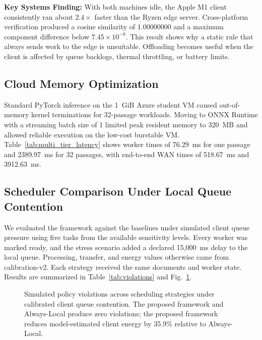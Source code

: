 \documentclass[conference]{IEEEtran}
\begin{document}
\textbf{Key Systems Finding:} With both machines idle, the Apple M1 client consistently ran about $2.4\times$ faster than the Ryzen edge server.
Cross-platform verification produced a cosine similarity of $1.00000000$ and a maximum component difference below $7.45\times10^{-8}$.
This result shows why a static rule that always sends work to the edge is unsuitable. Offloading becomes useful when the client is affected by queue backlogs, thermal throttling, or battery limits.

\subsection{Cloud Memory Optimization}
Standard PyTorch inference on the 1~GiB Azure student VM caused out-of-memory kernel terminations for 32-passage workloads.
Moving to ONNX Runtime with a streaming batch size of 1 limited peak resident memory to 320~MB and allowed reliable execution on the low-cost burstable VM.
Table~\ref{tab:multi_tier_latency} shows worker times of 76.29~ms for one passage and 2389.97~ms for 32 passages, with end-to-end WAN times of 518.67~ms and 3912.63~ms.

\subsection{Scheduler Comparison Under Local Queue Contention}
We evaluated the framework against the baselines under simulated client queue pressure using five tasks from the available sensitivity levels. Every worker was marked ready, and the stress scenario added a declared 15,000~ms delay to the local queue. Processing, transfer, and energy values otherwise came from calibration-v2. Each strategy received the same documents and worker state.
Results are summarized in Table~\ref{tab:violations} and Fig.~\ref{fig:violations}.

\begin{figure}[t]
\centering
{}
\caption{Simulated policy violations across scheduling strategies under calibrated client queue contention. The proposed framework and Always-Local produce zero violations; the proposed framework reduces model-estimated client energy by 35.9\% relative to Always-Local.}
\label{fig:violations}
\end{figure}
\end{document}
